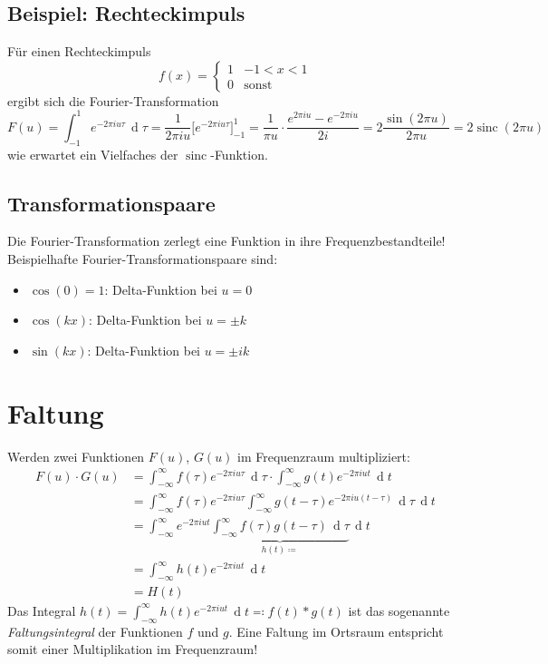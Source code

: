 \documentclass[a4paper, 11pt, accentcolor = tud3b]{tudreport}
\DeclareMathOperator{\total}{d}
\DeclareMathOperator{\sinc}{sinc}
\newcommand{\dif}[1]{\,\total#1}
\begin{document}
			\subsection{Beispiel: Rechteckimpuls}
				Für einen Rechteckimpuls
				\begin{equation*}
					f(x) =
						\begin{cases}
							1 & -1 < x < 1 \\
							0 & \text{sonst}
						\end{cases}
				\end{equation*}
				ergibt sich die Fourier-Transformation
				\begin{equation*}
					F(u) = \int_{-1}^{1} \! e^{-2\pi i u \tau} \dif{\tau} = \frac{1}{2\pi i u} \big[ e^{-2\pi i u \tau} \big]_{-1}^{1} = \frac{1}{\pi u} \cdot \frac{e^{2\pi i u} - e^{-2\pi i u}}{2i} = 2 \frac{\sin(2\pi u)}{2\pi u} = 2 \sinc(2\pi u)
				\end{equation*}
				wie erwartet ein Vielfaches der \( \sinc \)-Funktion.

			\subsection{Transformationspaare}
				Die Fourier-Transformation zerlegt eine Funktion in ihre Frequenzbestandteile! Beispielhafte Fourier-Transformationspaare sind:
				\begin{itemize}
					\item \( \cos(0) = 1 \): \tabto{2.5cm} Delta-Funktion bei \( u = 0 \)
					\item \( \cos(kx) \):    \tabto{2.5cm} Delta-Funktion bei \( u = \pm k \)
					\item \( \sin(kx) \):    \tabto{2.5cm} Delta-Funktion bei \( u = \pm ik \)
				\end{itemize}

		\section{Faltung}
			Werden zwei Funktionen \( F(u) \), \( G(u) \) im Frequenzraum multipliziert:
			\begin{align*}
				F(u) \cdot G(u)
					&= \int_{-\infty}^{\infty} \! f(\tau) e^{-2\pi i u \tau} \dif{\tau} \cdot \int_{-\infty}^{\infty} \! g(t) e^{-2\pi i u t} \dif{t} \\
					&= \int_{-\infty}^{\infty} \! f(\tau) e^{-2\pi i u \tau} \int_{-\infty}^{\infty} \! g(t - \tau) e^{-2\pi i u (t - \tau)} \dif{\tau} \dif{t} \\
					&= \int_{-\infty}^{\infty} \! e^{-2\pi i u t} \underbrace{\int_{-\infty}^{\infty} \! f(\tau) g(t - \tau) \dif{\tau}}_{h(t) \coloneqq} \dif{t} \\
					&= \int_{-\infty}^{\infty} \! h(t) e^{-2\pi i u t} \dif{t} \\
					&= H(t)
			\end{align*}
			Das Integral \( h(t) = \int_{-\infty}^{\infty} \! h(t) e^{-2\pi i u t} \dif{t} \eqqcolon f(t) \ast g(t) \) ist das sogenannte \emph{Faltungsintegral} der Funktionen \(f\) und \(g\). Eine Faltung im Ortsraum entspricht somit einer Multiplikation im Frequenzraum!
			
\end{document}
